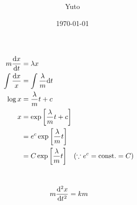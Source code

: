 \documentclass[uplatex]{jsarticle}
\title{  }
\date{\today}
\author{ Yuto }
\makeatletter
\def\mojiparline#1{
	\newcounter{mpl}
	\setcounter{mpl}{#1}
	\@tempdima=\linewidth
	\advance\@tempdima by-\value{mpl}zw
	\addtocounter{mpl}{-1}
	\divide\@tempdima by \value{mpl}
	\advance\kanjiskip by\@tempdima
	\advance\parindent by\@tempdima
}
\def\linesparpage#1{
	\baselineskip=\textheight
	\divide\baselineskip by #1
}
\makeatother
\begin{document}
\maketitle

\renewcommand{\thesection}{よくでる微分方程式\arabic{section}.}
\section{}

\begin{align*}
	m\dv{x}{t} &= \lambda x \\
	\int\dfrac{\mathrm{d}x}{x} &= \int \dfrac{\lambda }{m} \mathrm{d}t \\
	\log x &= \dfrac{\lambda }{m}t + c \\
	x &= \exp\qty[\dfrac{\lambda }{m}t + c] \\
	&= e^c\exp\qty[\dfrac{\lambda }{m}t] \\
	&= C\exp\qty[\dfrac{\lambda }{m}t] \qq{($\because e^c = \mathrm{const}. = C$)}
\end{align*}

\section{}

\begin{align*}
	m\dv[2]{x}{t} &= km
\end{align*}
\end{document}
